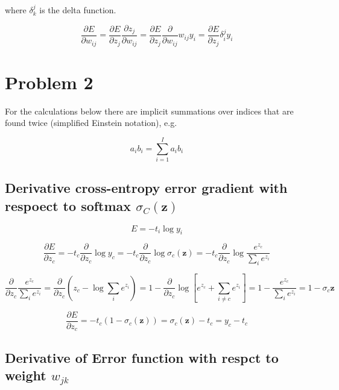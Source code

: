 \documentclass{article}
\begin{document}
where $\delta^j_k$ is the delta function.

\begin{equation}
\frac{\partial E}{\partial w_{ij}} = \frac{\partial E}{\partial z_j} \frac{\partial z_j}{\partial w_{ij}} = \frac{\partial E}{\partial z_j} \frac{\partial}{\partial w_{ij}} w_{ij}y_i = \frac{\partial E}{\partial z_j} \delta^j_i y_i
\end{equation}


\section*{Problem 2}

For the calculations below there are implicit summations over indices that are found twice (simplified Einstein notation), e.g.

\begin{equation}
a_i b_i = \sum_{i=1}^{I} a_i b_i
\end{equation} 

\subsection*{Derivative cross-entropy error gradient with respoect to softmax $\sigma_C(\bm{z})$}

\begin{equation}
E = -t_i \log{y_i}
\end{equation}

\begin{equation}
\frac{\partial E}{\partial z_c} = -t_c \frac{\partial}{\partial z_c} \log {y_c} = -t_c\frac{\partial}{\partial z_c} \log{\sigma_c(\bm{z})} = -t_c \frac{\partial}{\partial z_c}\log{\frac{e^{z_c}}{\sum_{i}e^{z_i}}}
\end{equation}

\begin{equation}
\frac{\partial}{\partial z_c} \frac{e^{z_c}}{\sum_{i}e^{z_i}} = \frac{\partial}{\partial z_c} \left(z_c-\log{\sum_i e^{z_i}}\right) = 1-\frac{\partial}{\partial z_c} \log{\left[e^{z_c}+\sum_{i\neq c}e^{z_i}\right]} = 1-\frac{e^{z_c}}{\sum_{i}e^{z_i}} = 1-\sigma_c{\bm{z}}
\end{equation}

\begin{equation}
\frac{\partial E}{\partial z_c} = -t_c\left(1- \sigma_c(\bm{z}) \right) = \sigma_c(\bm{z})-t_c = y_c-t_c
\end{equation}

\subsection*{Derivative of Error function with respct to weight $w_{jk}$}
\end{document}
